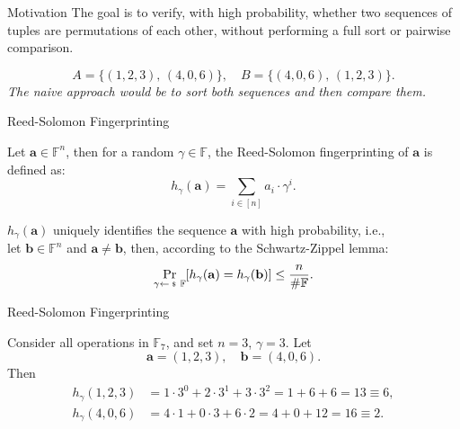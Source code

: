 \documentclass{zkdl-presentation-template}
\begin{document}
    \begin{frame}{Motivation}
        The goal is to verify, with high probability, whether two sequences of tuples
        are permutations of each other, without performing a full sort or pairwise comparison.
        \pause

        \begin{equation*}
        A = \{(1,2,3),\,(4,0,6)\}, \quad
        B = \{(4,0,6),\,(1,2,3)\}.
        \end{equation*}
        \pause
        \textit{The naive approach would be to sort both sequences and then compare them.}
    \end{frame}

    \begin{frame}{Reed-Solomon Fingerprinting}
        \begin{definition}
            Let $\mathbf{a} \in \mathbb{F}^{n}$, then for a random $\gamma \in \mathbb{F}$, the Reed-Solomon
            fingerprinting of $\mathbf{a}$ is defined as:
            \begin{equation*}
                h_{\gamma}(\mathbf{a}) = \sum_{i \in [n]} a_i \cdot \gamma^i.
            \end{equation*}
            \pause

            $h_{\gamma}(\mathbf{a})$ uniquely identifies the sequence $\mathbf{a}$ with high probability,
            i.e., \\let $\mathbf{b} \in \mathbb{F}^n$ and $\mathbf{a} \neq \mathbf{b}$, then, according to the Schwartz-Zippel lemma:
            \begin{equation*}
                \Pr_{\gamma \leftarrowS \mathbb{F}}[h_{\gamma}(\mathbf{a}) = h_{\gamma}(\mathbf{b})] \leq \frac{n}{\#\mathbb{F}}.
            \end{equation*}
        \end{definition}
    \end{frame}

    \begin{frame}{Reed-Solomon Fingerprinting}
        \begin{example}
            Consider all operations in $\mathbb{F}_7$, and set $n=3$, $\gamma=3$.
            Let
            \begin{equation*}
                \mathbf{a} = (1,2,3), \quad \mathbf{b} = (4,0,6).
            \end{equation*}
            \pause
            Then
            \begin{align*}
                h_{\gamma}(1,2,3) &=1\cdot3^0 + 2\cdot3^1 + 3\cdot3^2 =1 + 6 + 6 =13 \equiv 6,\\
                h_{\gamma}(4,0,6) &=4\cdot1 + 0\cdot3 + 6\cdot2 =4 + 0 + 12 =16 \equiv 2.
            \end{align*}
        \end{example}
    \end{frame}
\end{document}
